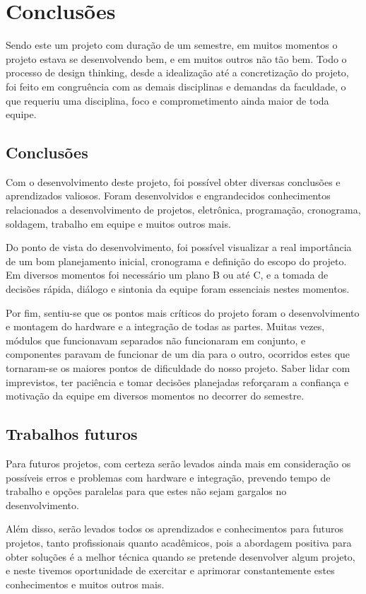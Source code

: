 \chapter{Conclusões}
Sendo este um projeto com duração de um semestre, em muitos momentos o projeto estava se desenvolvendo bem, e em muitos outros não tão bem. Todo o processo de design thinking, desde a idealização até a concretização do projeto, foi feito em congruência com as demais disciplinas e demandas da faculdade, o que requeriu uma disciplina, foco e comprometimento ainda maior de toda equipe. 

\section{Conclusões}
Com o desenvolvimento deste projeto, foi possível obter diversas conclusões e aprendizados valiosos. Foram desenvolvidos e engrandecidos conhecimentos relacionados a desenvolvimento de projetos, eletrônica, programação, cronograma, soldagem, trabalho em equipe e muitos outros mais. 

Do ponto de vista do desenvolvimento, foi possível visualizar a real importância de um bom planejamento inicial, cronograma e definição do escopo do projeto. Em diversos momentos foi necessário um plano B ou até C, e a tomada de decisões rápida, diálogo e sintonia da equipe foram essenciais nestes momentos.

Por fim, sentiu-se que os pontos mais críticos do projeto foram o desenvolvimento e montagem do hardware e a integração de todas as partes. Muitas vezes, módulos que funcionavam separados não funcionaram em conjunto, e componentes paravam de funcionar de um dia para o outro, ocorridos estes que tornaram-se os maiores pontos de dificuldade do nosso projeto. Saber lidar com imprevistos, ter paciência e tomar decisões planejadas reforçaram a confiança e motivação da equipe em diversos momentos no decorrer do semestre.

\section{Trabalhos futuros}
Para futuros projetos, com certeza serão levados ainda mais em consideração os possíveis erros e problemas com hardware e integração, prevendo tempo de trabalho e opções paralelas para que estes não sejam gargalos no desenvolvimento. 

Além disso, serão levados todos os aprendizados e conhecimentos para futuros projetos, tanto profissionais quanto acadêmicos, pois a abordagem positiva para obter soluções é a melhor técnica quando se pretende desenvolver algum projeto, e neste tivemos oportunidade de exercitar e aprimorar constantemente estes conhecimentos e muitos outros mais.


